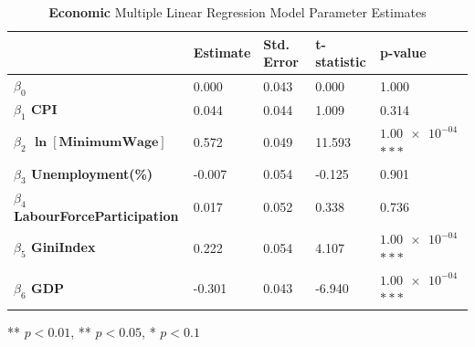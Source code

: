 \documentclass{article}
\begin{document}
\begin{appendices}
\begin{table}[H]
    \centering
        \begin{threeparttable}
            \begin{tabular}{l l l l l}
              \toprule & \textbf{Estimate} & \textbf{Std. Error} & \textbf{t-statistic} & \textbf{p-value} \\ \midrule
            \textbf{$\beta_0$} & 0.000 & 0.043 & 0.000 & 1.000 \\ 
            \textbf{$\beta_1$ CPI} & 0.044 & 0.044 & 1.009 & 0.314  \\ 
            \textbf{$\beta_2$ $\bm{\ln{[\text{MinimumWage}]}}$} & 0.572 & 0.049 & 11.593 & $\num{1.00e-04}$ $***$  \\ 
            \textbf{$\beta_3$ Unemployment(\%)} & -0.007 & 0.054 & -0.125 & 0.901 \\ 
            \textbf{$\beta_4$ LabourForceParticipation} & 0.017 & 0.052 & 0.338 & 0.736 \\ 
            \textbf{$\beta_5$ GiniIndex} & 0.222 & 0.054 & 4.107 & $\num{1.00e-04}$ $***$ \\ 
            \textbf{$\beta_6$ GDP} & -0.301 & 0.043 & -6.940 & $\num{1.00e-04}$ $***$ \\ \bottomrule
            \end{tabular}
            \begin{tablenotes}
                \small
                \item *** $p < 0.01$, ** $p < 0.05$, * $p < 0.1$
            \end{tablenotes}
        \end{threeparttable}
    \caption{\label{table: descriptivestatseconomic}\textbf{Economic} Multiple Linear Regression Model Parameter Estimates}
\end{table}


\end{appendices}
\end{document}
